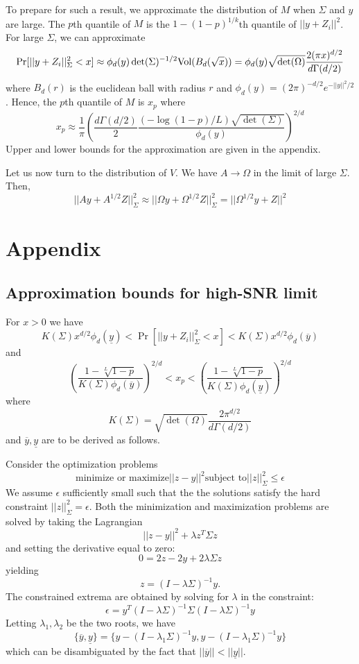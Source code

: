 \documentclass[12pt]{article}
\begin{document}
To prepare for such a result, we approximate the distribution of $M$ when $\Sigma$ and $y$ are large.
The $p$th quantile of $M$ is the $1-(1-p)^{1/k}$th quantile of $||y + Z_i||^2$.
For large $\Sigma$, we can approximate
\[
\Pr[||y+ Z_i||^2_\Sigma < x] \approx \phi_d(y) \det(\Sigma)^{-1/2}\text{Vol}(B_d(\sqrt{x})) = 
\phi_d(y) \sqrt{\det(\Omega)} \frac{2(\pi x)^{d/2}}{d\Gamma(d/2)}
\]
where $B_d(r)$ is the euclidean ball with radius $r$ and $\phi_d(y) = (2\pi)^{-d/2} e^{-||y||^2/2}$.
Hence, the $p$th quantile of $M$ is $x_p$ where
\[
x_p \approx \frac{1}{\pi}\left(
\frac{d\Gamma(d/2)}{2} \frac{(-\log(1-p)/L)\sqrt{\det(\Sigma)}}{\phi_d(y)}
\right)^{2/d}
\]
Upper and lower bounds for the approximation are given in the appendix.


Let us now turn to the distribution of $V$.
We have $A \to \Omega$ in the limit of large $\Sigma$.
Then,
\[
||Ay + A^{1/2}Z||^2_\Sigma \approx ||\Omega y + \Omega^{1/2}Z||^2_\Sigma = ||\Omega^{1/2} y + Z||^2
\]

\section{Appendix}

\subsection{Approximation bounds for high-SNR limit}

For $x > 0$ we have
\[
K(\Sigma)x^{d/2}\phi_d(\underline{y})< \Pr[||y+Z_i||^2_\Sigma < x] < K(\Sigma)x^{d/2}\phi_d(\overline{y})
\]
and
\[
\left(\frac{1-\sqrt[L]{1-p}}{K(\Sigma)\phi_d(\overline{y})}\right)^{2/d}
< x_p < 
\left(\frac{1-\sqrt[L]{1-p}}{K(\Sigma)\phi_d(\underline{y})}\right)^{2/d}
\]
where
\[
K(\Sigma) = \sqrt{\det(\Omega)} \frac{2\pi^{d/2}}{d\Gamma(d/2)}
\]
and $\overline{y}, \underline{y}$ are to be derived as follows.

Consider the optimization problems
\[
\text{minimize or maximize} ||z-y||^2 \text{subject to}||z||_\Sigma^2 \leq \epsilon
\]
We assume $\epsilon$ sufficiently small such that the the solutions
satisfy the hard constraint $||z||_\Sigma^2 = \epsilon$.  Both the
minimization and maximization problems are solved by taking the
Lagrangian
\[
||z-y||^2 + \lambda z^T \Sigma z
\]
and setting the derivative equal to zero:
\[
0 = 2z - 2y + 2\lambda\Sigma z
\]
yielding
\[
z = (I- \lambda \Sigma)^{-1}y.
\]
The constrained extrema are obtained by solving for $\lambda$ in the constraint:
\[
\epsilon = y^T(I-\lambda\Sigma)^{-1}\Sigma(I-\lambda\Sigma)^{-1}y
\]
Letting $\lambda_1,\lambda_2$ be the two roots, we have 
\[\{\overline{y}, \underline{y}\} = \{y - (I- \lambda_1 \Sigma)^{-1}y, y - (I- \lambda_1 \Sigma)^{-1}y\}\]
which can be disambiguated by the fact that $||\overline{y}|| < ||\underline{y}||$.
\end{document}
